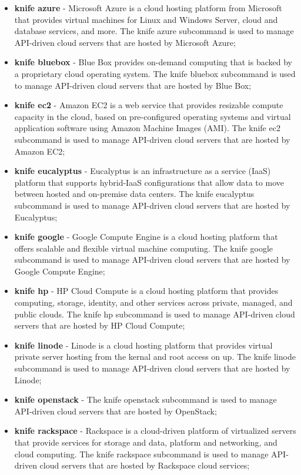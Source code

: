 \begin{itemize}
  \item \textbf{knife azure} - Microsoft Azure is a cloud hosting platform from Microsoft that provides virtual machines for Linux and Windows Server, cloud and database services, and more. The knife azure subcommand is used to manage API-driven cloud servers that are hosted by Microsoft Azure;
  \item \textbf{knife bluebox} - Blue Box provides on-demand computing that is backed by a proprietary cloud operating system. The knife bluebox subcommand is used to manage API-driven cloud servers that are hosted by Blue Box;
  \item \textbf{knife ec2} - Amazon EC2 is a web service that provides resizable compute capacity in the cloud, based on pre-configured operating systems and virtual application software using Amazon Machine Images (AMI). The knife ec2 subcommand is used to manage API-driven cloud servers that are hosted by Amazon EC2;
  \item \textbf{knife eucalyptus} - Eucalyptus is an infrastructure as a service (IaaS) platform that supports hybrid-IaaS configurations that allow data to move between hosted and on-premise data centers. The knife eucalyptus subcommand is used to manage API-driven cloud servers that are hosted by Eucalyptus;
  \item \textbf{knife google} - Google Compute Engine is a cloud hosting platform that offers scalable and flexible virtual machine computing. The knife google subcommand is used to manage API-driven cloud servers that are hosted by Google Compute Engine;
  \item \textbf{knife hp} - HP Cloud Compute is a cloud hosting platform that provides computing, storage, identity, and other services across private, managed, and public clouds. The knife hp subcommand is used to manage API-driven cloud servers that are hosted by HP Cloud Compute;
  \item \textbf{knife linode} - Linode is a cloud hosting platform that provides virtual private server hosting from the kernal and root access on up. The knife linode subcommand is used to manage API-driven cloud servers that are hosted by Linode;
  \item \textbf{knife openstack} - The knife openstack subcommand is used to manage API-driven cloud servers that are hosted by OpenStack;
  \item \textbf{knife rackspace} - Rackspace is a cloud-driven platform of virtualized servers that provide services for storage and data, platform and networking, and cloud computing. The knife rackspace subcommand is used to manage API-driven cloud servers that are hosted by Rackspace cloud services;

\end{itemize}

